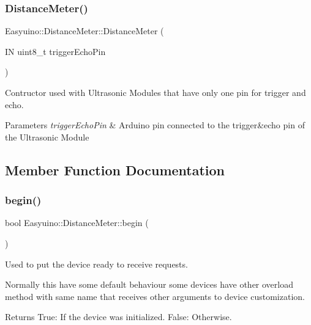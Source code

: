 \subsubsection{\texorpdfstring{Distance\+Meter()}{DistanceMeter()}\hspace{0.1cm}{\footnotesize\ttfamily [2/2]}}
{\footnotesize\ttfamily Easyuino\+::\+Distance\+Meter\+::\+Distance\+Meter (\begin{DoxyParamCaption}\item[{IN uint8\+\_\+t}]{trigger\+Echo\+Pin }\end{DoxyParamCaption})}



Contructor used with Ultrasonic Modules that have only one pin for trigger and echo. 


\begin{DoxyParams}{Parameters}
{\em trigger\+Echo\+Pin} & Arduino pin connected to the trigger\&echo pin of the Ultrasonic Module \\
\hline
\end{DoxyParams}


\subsection{Member Function Documentation}
\mbox{\label{class_easyuino_1_1_distance_meter_a0374e6f806cd71f0f918c6ea7b7700a0}} 
\subsubsection{\texorpdfstring{begin()}{begin()}}
{\footnotesize\ttfamily bool Easyuino\+::\+Distance\+Meter\+::begin (\begin{DoxyParamCaption}{ }\end{DoxyParamCaption})\hspace{0.3cm}{\ttfamily [virtual]}}



Used to put the device ready to receive requests. 

Normally this have some default behaviour some devices have other overload method with same name that receives other arguments to device customization. \begin{DoxyReturn}{Returns}
True\+: If the device was initialized. False\+: Otherwise. 
\end{DoxyReturn}


